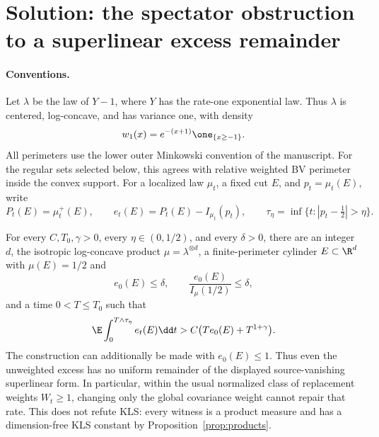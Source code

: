 \documentclass[../main.tex]{subfiles}
\begin{document}
%
\section*{Solution: the spectator obstruction to a superlinear excess remainder}
\label{sec:sol-spectator-excess-rate-obstruction}

\paragraph{Conventions.}
Let $\lambda$ be the law of $Y-1$, where $Y$ has the rate-one exponential law.  Thus
$\lambda$ is centered, log-concave, and has variance one, with density
\[
  w_1(x)=e^{-(x+1)}\one_{\{x\ge-1\}}.
\]
All perimeters use the lower outer Minkowski convention of the manuscript.  For the regular
sets selected below, this agrees with relative weighted BV perimeter inside the convex support.
For a localized law $\mu_t$, a fixed cut $E$, and $p_t=\mu_t(E)$, write
\[
  P_t(E)=\mu_t^+(E),\qquad
  e_t(E)=P_t(E)-I_{\mu_t}(p_t),\qquad
  \tau_\eta=\inf\{t:|p_t-\tfrac12|>\eta\}.
\]

\begin{theorem}
\label{thm:sol-spectator-excess-rate-obstruction}
For every $C,T_0,\gamma>0$, every $\eta\in(0,1/2)$, and every $\delta>0$, there are an
integer $d$, the isotropic log-concave product $\mu=\lambda^{\otimes d}$, a finite-perimeter
cylinder $E\subset\R^d$ with $\mu(E)=1/2$ and
\[
  e_0(E)\le\delta,
  \qquad
  \frac{e_0(E)}{I_\mu(1/2)}\le\delta,
\]
and a time $0<T\le T_0$ such that
\begin{equation}
  \E\int_0^{T\wedge\tau_\eta}e_t(E)\dd t
  >C\bigl(Te_0(E)+T^{1+\gamma}\bigr).
  \label{eq:sol-spectator-rate-violation}
\end{equation}
The construction can additionally be made with $e_0(E)\le1$.  Thus even the unweighted
excess has no uniform remainder of the displayed source-vanishing superlinear form.  In
particular, within the usual normalized class of replacement weights $W_t\ge1$, changing only
the global covariance weight cannot repair that rate.  This does not refute KLS: every witness
is a product measure and has a dimension-free KLS constant by Proposition~\ref{prop:products}.
\end{theorem}
\end{document}
